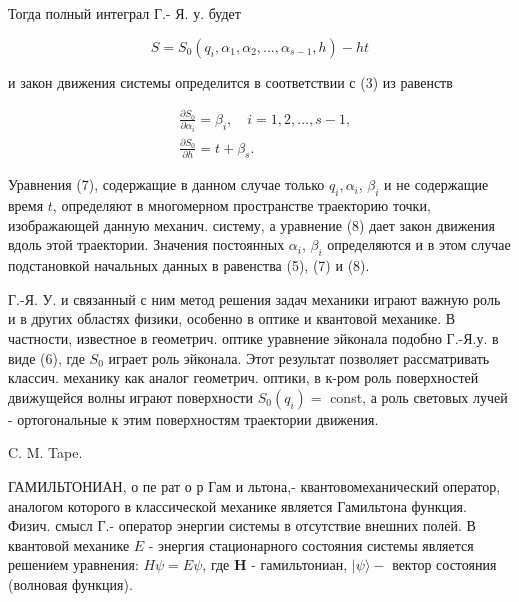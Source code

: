 \documentclass[10pt]{article}
\begin{document}
Тогда полный интеграл Г.- Я. у. будет



\[

S=S_{0}\left(q_{i}, \alpha_{1}, \alpha_{2}, \ldots, \alpha_{s-1}, h\right)-h t

\]



и закон движения системы определится в соответствии с (3) из равенств



\[

\begin{aligned}

& \frac{\partial S_{0}}{\partial \alpha_{i}}=\beta_{i}, \quad i=1,2, \ldots, s-1, \\

& \frac{\partial S_{0}}{\partial h}=t+\beta_{s} .

\end{aligned}

\]



Уравнения (7), содержащие в данном случае только $q_{i}, \alpha_{i}$, $\beta_{i}$ и не содержащие время $t$, определяют в многомерном пространстве траекторию точки, изображающей данную механич. систему, а уравнение (8) дает закон движения вдоль этой траектории. Значения постоянных $\alpha_{i}$, $\beta_{i}$ определяются и в этом случае подстановкой начальных данных в равенства (5), (7) и (8).



Г.-Я. У. и связанный с ним метод решения задач механики играют важную роль и в других областях физики, особенно в оптике и квантовой механике. В частности, известное в геометрич. оптике уравнение эйконала подобно Г.-Я.у. в виде (6), где $S_{0}$ играет роль эйконала. Этот результат позволяет рассматривать классич. механику как аналог геометрич. оптики, в к-ром роль поверхностей движущейся волны играют поверхности $S_{0}\left(q_{i}\right)=$ const, а роль световых лучей - ортогональные к этим поверхностям траектории движения.



C. M. Tape.



ГАМИЛЬТОНИАН, о пе рат о р Гам и льтона,- квантовомеханический оператор, аналогом которого в классической механике является Гамильтона функция. Физич. смысл Г.- оператор энергии системы в отсутствие внешних полей. В квантовой механике $E$ - энергия стационарного состояния системы является решением уравнения: $H \psi=E \psi$, где $\boldsymbol{H}$ - гамильтониан, $|\psi\rangle-$ вектор состояния (волновая функция).
\end{document}
